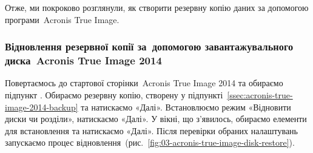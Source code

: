 \documentclass[
	a4paper,
	oneside,
	BCOR = 10mm,
	DIV = 12,
	12pt,
	headings = normal,
]{scrartcl}
\begin{document}
				Отже, ми покроково розглянули, як створити резервну копію даних за допомогою програми~\textenglish{Acronis True Image}.

			\subsubsection{Відновлення резервної копії за~допомогою завантажувального диска~\textenglish{Acronis True Image 2014}}
				Повертаємось до стартової сторінки~\textenglish{Acronis True Image 2014} та обираємо підпункт . Обираємо резервну копію, створену у підпункті~\ref{ssec:acronis-true-image-2014-backup} та натискаємо «Далі». Встановлюємо режим «Відновити диски чи розділи», натискаємо «Далі». У вікні, що з'явилось, обираємо елементи для встановлення та натискаємо «Далі». Після перевірки обраних налаштувань запускаємо процес відновлення~(рис.~\ref{fig:03-acronis-true-image-disk-restore}).
\end{document}
